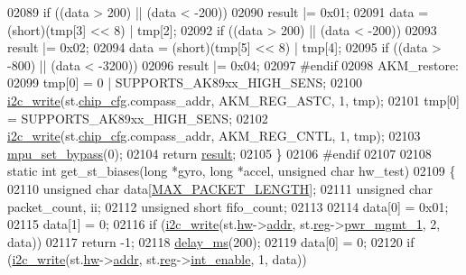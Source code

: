 \begin{DoxyCode}
{{{{{{{02089     \textcolor{keywordflow}{if} ((data > 200) || (data < -200))
02090         result |= 0x01;
02091     data = (short)(tmp[3] << 8) | tmp[2];
02092     \textcolor{keywordflow}{if} ((data > 200) || (data < -200))
02093         result |= 0x02;
02094     data = (short)(tmp[5] << 8) | tmp[4];
02095     \textcolor{keywordflow}{if} ((data > -800) || (data < -3200))
02096         result |= 0x04;
02097 \textcolor{preprocessor}{#endif}
02098 AKM\_restore:
02099     tmp[0] = 0 | SUPPORTS\_AK89xx\_HIGH\_SENS;
02100     \hyperlink{_i2_c_8c_ac0f145afe8d662af199043939f4398d6}{i2c\_write}(st.\hyperlink{structgyro__state__s_ac895217592e2084bd520b0be8e9d20ee}{chip\_cfg}.compass\_addr, AKM\_REG\_ASTC, 1, tmp);
02101     tmp[0] = SUPPORTS\_AK89xx\_HIGH\_SENS;
02102     \hyperlink{_i2_c_8c_ac0f145afe8d662af199043939f4398d6}{i2c\_write}(st.\hyperlink{structgyro__state__s_ac895217592e2084bd520b0be8e9d20ee}{chip\_cfg}.compass\_addr, AKM\_REG\_CNTL, 1, tmp);
02103     \hyperlink{group___d_r_i_v_e_r_s_ga36f70f38371b48d81094d3b061233e15}{mpu\_set\_bypass}(0);
02104     \textcolor{keywordflow}{return} \hyperlink{sensor_8h_a4c9d9cb8bb9d2b707a152051408f40e5}{result};
02105 \}
02106 \textcolor{preprocessor}{#endif}
02107 
02108 \textcolor{keyword}{static} \textcolor{keywordtype}{int} get\_st\_biases(\textcolor{keywordtype}{long} *gyro, \textcolor{keywordtype}{long} *accel, \textcolor{keywordtype}{unsigned} \textcolor{keywordtype}{char} hw\_test)
02109 \{
02110     \textcolor{keywordtype}{unsigned} \textcolor{keywordtype}{char} data[\hyperlink{inv__mpu_8c_a973c680573b37fc359fc68d0707da355}{MAX\_PACKET\_LENGTH}];
02111     \textcolor{keywordtype}{unsigned} \textcolor{keywordtype}{char} packet\_count, ii;
02112     \textcolor{keywordtype}{unsigned} \textcolor{keywordtype}{short} fifo\_count;
02113 
02114     data[0] = 0x01;
02115     data[1] = 0;
02116     \textcolor{keywordflow}{if} (\hyperlink{_i2_c_8c_ac0f145afe8d662af199043939f4398d6}{i2c\_write}(st.\hyperlink{structgyro__state__s_a5bac30a96752691e4cc723735060e360}{hw}->\hyperlink{structhw__s_a4c34a946600e9d68b6355d23f54d291b}{addr}, st.\hyperlink{structgyro__state__s_ae857e1285c583b7438a208edd691a38e}{reg}->\hyperlink{structgyro__reg__s_ad746a196c317f0f4d557a92b9eb98d34}{pwr\_mgmt\_1}, 2, data))
02117         \textcolor{keywordflow}{return} -1;
02118     \hyperlink{inv__mpu_8c_ae36aca5baf9b6b7d74992aef00686d67}{delay\_ms}(200);
02119     data[0] = 0;
02120     \textcolor{keywordflow}{if} (\hyperlink{_i2_c_8c_ac0f145afe8d662af199043939f4398d6}{i2c\_write}(st.\hyperlink{structgyro__state__s_a5bac30a96752691e4cc723735060e360}{hw}->\hyperlink{structhw__s_a4c34a946600e9d68b6355d23f54d291b}{addr}, st.\hyperlink{structgyro__state__s_ae857e1285c583b7438a208edd691a38e}{reg}->\hyperlink{structgyro__reg__s_ab0cc290f4f43cd8a8b6562a97f540493}{int\_enable}, 1, data))
}}}}}}}
\end{DoxyCode}
